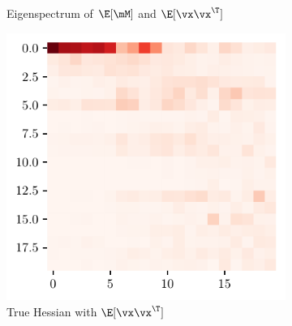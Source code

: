 \begin{figure}[H]
\begin{subfigure}[b]{0.24\textwidth}
        \caption{Eigenspectrum of $\E[\mM]$ and $\E[\vx\vx^\T]$}
        \label{fig:app_adexp_vgg_sig}
    \end{subfigure}%
    \begin{subfigure}[b]{0.24\textwidth}
        \centering
        \captionsetup{justification=centering}
        \includegraphics[width=\textwidth]{Appendix_Figures/Overlap_large_model/FailExplanation/VGGearly/xxT_Trueest_real_corr_expand_t20_CIFAR10_Exp1_VGG11W200_fxlr0.01_E-1_features.11.pdf}
        \caption{True Hessian with $\E[\vx\vx^\T]$}
        \label{fig:app_adexp_vgg_corr_real}
    \end{subfigure}
    \begin{subfigure}[b]{0.24\textwidth}
        \centering
        \captionsetup{justification=centering}

\end{subfigure}
\end{figure}
